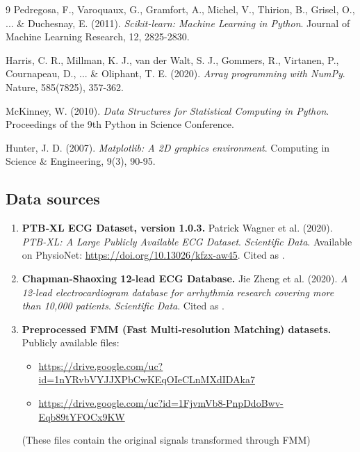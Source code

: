 \documentclass[11pt]{article}
\begin{document}
\begin{thebibliography}{9}
Pedregosa, F., Varoquaux, G., Gramfort, A., Michel, V., Thirion, B., Grisel, O., ... \& Duchesnay, E. (2011).
\textit{Scikit-learn: Machine Learning in Python}. Journal of Machine Learning Research, 12, 2825-2830.

Harris, C. R., Millman, K. J., van der Walt, S. J., Gommers, R., Virtanen, P., Cournapeau, D., ... \& Oliphant, T. E. (2020).
\textit{Array programming with NumPy}. Nature, 585(7825), 357-362.

McKinney, W. (2010).
\textit{Data Structures for Statistical Computing in Python}. Proceedings of the 9th Python in Science Conference.

Hunter, J. D. (2007).
\textit{Matplotlib: A 2D graphics environment}. Computing in Science \& Engineering, 9(3), 90-95.

\end{thebibliography}

\subsection*{Data sources}

\begin{enumerate}
  \item \textbf{PTB‑XL ECG Dataset, version 1.0.3.}
    Patrick Wagner et al. (2020). \emph{PTB-XL: A Large Publicly Available ECG Dataset}. \emph{Scientific Data}. Available on PhysioNet: \url{https://doi.org/10.13026/kfzx-aw45}. Cited as \cite{wagner2020ptb}.

  \item \textbf{Chapman‑Shaoxing 12-lead ECG Database.}
    Jie Zheng et al. (2020). \emph{A 12-lead electrocardiogram database for arrhythmia research covering more than 10,000 patients}. \emph{Scientific Data}. Cited as \cite{zheng2020chapman}.

  \item \textbf{Preprocessed FMM (Fast Multi‑resolution Matching) datasets.}
    Publicly available files:
    \begin{itemize}
      \item \url{https://drive.google.com/uc?id=1nYRvbVYJJXPbCwKEqOIeCLnMXdIDAka7}
      \item \url{https://drive.google.com/uc?id=1FjvmVb8-PnpDdoBwv-Eqb89tYFOCx9KW}
    \end{itemize}
    (These files contain the original signals transformed through FMM)
\end{enumerate}
\end{document}
